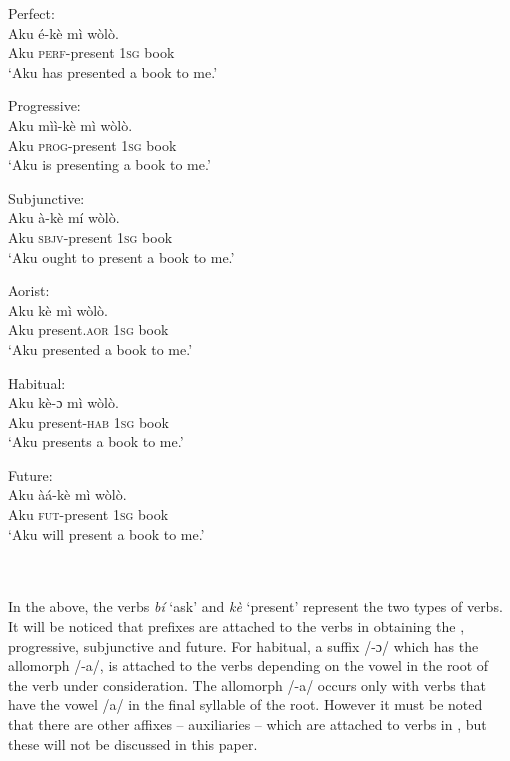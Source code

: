 \documentclass[output=paper
,newtxmath
,modfonts
,nonflat]{langsci/langscibook}
\begin{document}
\begin{minipage}{.5\textwidth}
\ea \label{ex:ollennu:46} 
Perfect:\\
\gll Aku \'e-k\`e m\`i w\`ol\`o.\\
Aku \textsc{perf}-present 1\textsc{sg} book\\
\glt 	`Aku has presented a book to me.'

\ex Progressive:\\
\gll Aku m\`i\`i-k\`e m\`i w\`ol\`o.\\
Aku \textsc{prog}-present 1\textsc{sg} book\\
\glt `Aku is presenting a book to me.'

\ex Subjunctive:\\
\gll Aku \`a-k\`e m\'i w\`ol\`o.\\
Aku \textsc{sbjv}-present 1\textsc{sg} book\\
\glt `Aku ought to present a book to me.'
\z
\end{minipage}
\begin{minipage}{.5\textwidth}
\ea Aorist:\\
\gll Aku k\`e m\`i w\`ol\`o.\\
Aku present.\textsc{aor} 1\textsc{sg} book\\
\glt `Aku presented a book to me.'

\ex Habitual:\\
\gll Aku k\`e-ɔ m\`i w\`ol\`o.\\
Aku present-\textsc{hab} 1\textsc{sg} book\\
\glt `Aku presents a book to me.'

\ex Future:\\
\gll Aku \`a\'a-k\`e m\`i w\`ol\`o.\\
Aku \textsc{fut}-present 1\textsc{sg} book\\
\glt `Aku will present a book to me.'
\z
\end{minipage}\\\\

In the above, the verbs  \textit{b\'i} `ask' and \textit{k\`e} `present' represent the two types of verbs. It will be noticed that prefixes are attached to the verbs in obtaining the , progressive, subjunctive and future. For habitual, a suffix /-ɔ/ which has the allomorph /-a/, is attached to the verbs depending on the vowel in the root of the verb under consideration. The allomorph /-a/ occurs only with verbs that have the vowel /a/ in the final syllable of the root. However it must be noted that there are other affixes -- auxiliaries -- which are attached to verbs in , but these will not be discussed in this paper.
\end{document}
